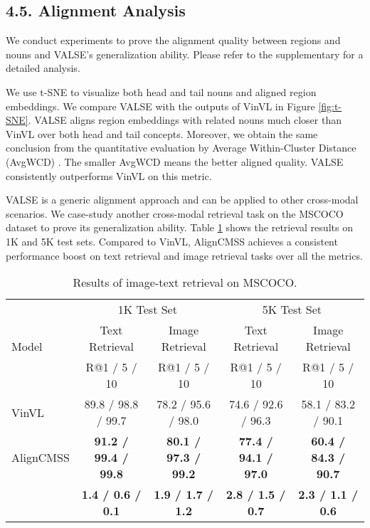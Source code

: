 \documentclass[letterpaper]{article} \usepackage{aaai24}  \usepackage{times}  \usepackage{helvet}  \usepackage{courier}  \usepackage[hyphens]{url}  \usepackage{graphicx} \urlstyle{rm} \def\UrlFont{\rm}  \usepackage{natbib}  \usepackage{caption} \frenchspacing  \setlength{\pdfpagewidth}{8.5in}  \setlength{\pdfpageheight}{11in}
\begin{document}
\subsection{4.5. Alignment Analysis}
We conduct experiments to prove the alignment quality between regions and nouns and VALSE's generalization ability. Please refer to the supplementary for a detailed analysis.

We use t-SNE \cite{van2008visualizing} to visualize both head and tail nouns and aligned region embeddings. We compare VALSE with the outputs of VinVL in Figure \ref{fig:t-SNE}. VALSE aligns region embeddings with related nouns much closer than VinVL over both head and tail concepts. Moreover, we obtain the same conclusion from the quantitative evaluation by Average Within-Cluster Distance (AvgWCD) \cite{edwards1965method}. 
The smaller AvgWCD means the better aligned quality. VALSE consistently outperforms VinVL on this metric. 


 VALSE is a generic alignment approach and can be applied to other cross-modal scenarios.
We case-study another cross-modal retrieval task on the MSCOCO dataset \cite{10.1007/978-3-319-10602-1_48} to prove its generalization ability. Table \ref{tab:coco} shows the retrieval results on 1K and 5K test sets. Compared to VinVL, AlignCMSS achieves a consistent performance boost on text retrieval and image retrieval tasks over all the metrics. 

\begin{table}[t]
\centering
\setlength{\abovecaptionskip}{5pt}
\setlength{\belowcaptionskip}{-10pt}
\setlength{\tabcolsep}{0.91mm}
\scalebox{0.93}
{\scriptsize
\renewcommand\arraystretch{1.1}
\begin{tabular}{l|cc|cc}
\toprule
\multirow{3}{*}{Model} & \multicolumn{2}{c|}{1K Test Set}          & \multicolumn{2}{c}{5K Test Set}         \\
                       & Text Retrieval      & Image Retrieval    & Text Retrieval     & Image Retrieval    \\ \cline{2-5} 
                       & R@1 / 5 / 10       & R@1 / 5 / 10      & R@1 / 5 / 10      & R@1 / 5 / 10      \\ \hline
VinVL                  & 89.8 /  98.8 / 99.7 & 78.2 / 95.6 / 98.0 & 74.6 / 92.6 / 96.3 & 58.1 / 83.2 / 90.1 \\
AlignCMSS                  & \textbf{91.2 /  99.4 / 99.8} & \textbf{80.1 / 97.3 / 99.2} &  \textbf{77.4 / 94.1 / 97.0}    & \textbf{60.4 / 84.3 / 90.7}    \\
       & \textbf{\hphantom{1}1.4 /\hphantom{1} 0.6 / \hphantom{1}0.1}     & \textbf{\hphantom{1}1.9 / \hphantom{1}1.7 / \hphantom{1}1.2}    & \textbf{\hphantom{1}2.8 / \hphantom{1}1.5 / \hphantom{1}0.7}                  & \textbf{\hphantom{1}2.3 / \hphantom{1}1.1 / \hphantom{1}0.6}           \\ \bottomrule
\end{tabular}}
\vspace{1pt}
\caption{Results of image-text retrieval on MSCOCO.}
\label{tab:coco}
\end{table}
\end{document}

